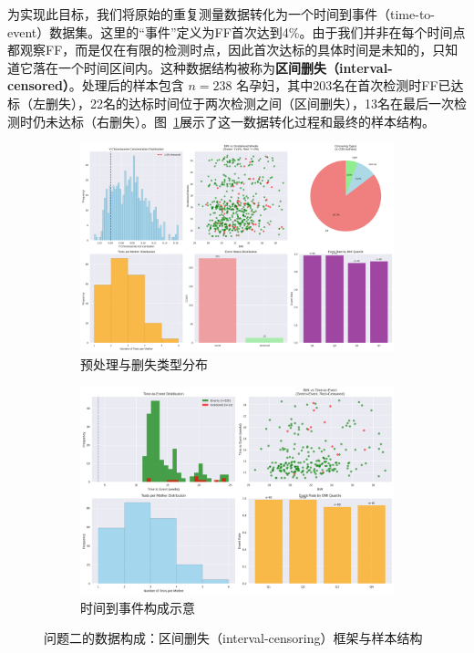 \documentclass[withoutpreface]{cumcmthesis}
\begin{document}
为实现此目标，我们将原始的重复测量数据转化为一个时间到事件（time-to-event）数据集。这里的“事件”定义为FF首次达到4\%。由于我们并非在每个时间点都观察FF，而是仅在有限的检测时点，因此首次达标的具体时间是未知的，只知道它落在一个时间区间内。这种数据结构被称为\textbf{区间删失（interval-censored）}。处理后的样本包含 $n=238$ 名孕妇，其中203名在首次检测时FF已达标（左删失），22名的达标时间位于两次检测之间（区间删失），13名在最后一次检测时仍未达标（右删失）。图~\ref{fig:p2_preprocess_time}展示了这一数据转化过程和最终的样本结构。

\begin{figure}[htbp]
\centering
\begin{subfigure}{0.48\textwidth}
  \centering
  \includegraphics[width=\linewidth]{output/figures/p2_preprocessing_analysis.png}
  \caption{预处理与删失类型分布}
\end{subfigure}\hfill
\begin{subfigure}{0.48\textwidth}
  \centering
  \includegraphics[width=\linewidth]{output/figures/p2_time_to_event_analysis.png}
  \caption{时间到事件构成示意}
\end{subfigure}
\caption{问题二的数据构成：区间删失（interval-censoring）框架与样本结构}
\label{fig:p2_preprocess_time}
\end{figure}
\end{document}
